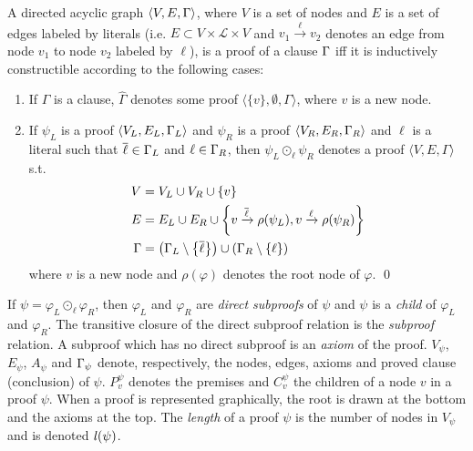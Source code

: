 \documentclass{llncs}
\begin{document}
\newcommand{\axiom}[1]{\widehat{#1}}
\newcommand{\n}{v}
\newcommand{\raiz}[1]{\rho(#1)}

\begin{definition}[Proof] 
\label{def:proof}
A directed acyclic graph $\langle V, E, \Gamma \rangle$, where $V$ is a set of nodes and $E$ is a
set of edges labeled by literals (i.e. $E \subset V \times \mathcal{L} \times V$ and $\n_1
\xrightarrow{\ell} \n_2$ denotes an edge from node $\n_1$ to node $\n_2$ labeled by $\ell$), is a
proof of a clause $\Gamma$ iff it is inductively constructible according to the following cases:
%
\begin{enumerate}
  \item If $\Gamma$ is a clause, $\axiom{\Gamma}$ denotes some proof $\langle \{ \n \}, \emptyset ,
    \Gamma \rangle$, where $\n$ is a new node.
  \item If $\psi_L$ is a proof $\langle V_L, E_L, \Gamma_L \rangle$ and
    $\psi_R$ is a proof $\langle V_R, E_R, \Gamma_R \rangle$ and $\ell$ is a literal such that
    $\overline{\ell} \in \Gamma_L$ and $\ell \in \Gamma_R$, then
    $\psi_L \odot_\ell \psi_R$ denotes a proof $\langle V, E, \Gamma \rangle$ s.t.
    \begin{align*}
      V &= V_L \cup V_R \cup \{\n \} \\
      E &= E_L \cup E_R \cup
                    \left\{ \n \xrightarrow{\dual{\ell}} \raiz{\psi_L}, \n \xrightarrow{\ell} \raiz{\psi_R} \right\} \\
     \Gamma &= \left( \clause_L \setminus \left\{ \dual{\ell} \right\} \right) \cup \left( \clause_R
                    \setminus \left\{ \ell \right\} \right)
    \end{align*}
    where $\n$ is a new node and $\raiz{\varphi}$ denotes the root node of $\varphi$.
  \qed
\end{enumerate}
\end{definition}


\newcommand{\Vertices}[1]{V_{#1}}
\newcommand{\Edges}[1]{E_{#1}}
\newcommand{\Conclusion}[1]{\clause_{#1}}
\newcommand{\Premises}[2]{P_{#1}^{#2}}
\newcommand{\Children}[2]{C_{#1}^{#2}}
\newcommand{\Axioms}[1]{A_{#1}}

\noindent
If $\psi = \varphi_L \odot_{\ell} \varphi_R$, then $\varphi_L$ and $\varphi_R$ are \emph{direct
subproofs} of $\psi$ and $\psi$ is a \emph{child} of $\varphi_L$ and $\varphi_R$. The
transitive closure of the direct subproof relation is the \emph{subproof} relation. A subproof which
has no direct subproof is an \emph{axiom} of the proof. 
%
$\Vertices{\psi}$, $\Edges{\psi}$, $\Axioms{\psi}$ and $\Conclusion{\psi}$
denote, respectively, the nodes, edges, axioms and proved clause (conclusion) of $\psi$. $\Premises{\n}{\psi}$ denotes the premises and $\Children{\n}{\psi}$ the children of a node $\n$ in a proof $\psi$. When a proof is represented graphically, the root is drawn at the bottom and the axioms at the top. The \emph{length} of a proof $\psi$ is the number of nodes in $\Vertices{\psi}$ and is denoted $\mathit{l}(\psi)$.
\end{document}
